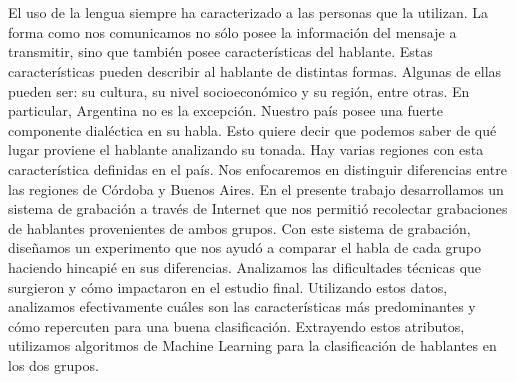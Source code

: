 \chapter*{\runtitulo}

\noindent 

El uso de la lengua siempre ha caracterizado a las personas que la utilizan. La forma como nos comunicamos no sólo posee la información del mensaje a transmitir, sino que también posee características del hablante. Estas características pueden describir al hablante de distintas formas. Algunas de ellas pueden ser: su cultura, su nivel socioeconómico y su región, entre otras. En particular, Argentina no es la excepción. Nuestro país posee una fuerte componente dialéctica en su habla. Esto quiere decir que podemos saber de qué lugar proviene el hablante analizando su tonada. Hay varias regiones con esta característica definidas en el país. Nos enfocaremos en distinguir diferencias entre las regiones de Córdoba y Buenos Aires. En el presente trabajo desarrollamos un sistema de grabación a través de Internet que nos permitió recolectar grabaciones de hablantes provenientes de ambos grupos. Con este sistema de grabación, diseñamos un experimento que nos ayudó a comparar el habla de cada grupo haciendo hincapié en sus diferencias. Analizamos las dificultades técnicas que surgieron y cómo impactaron en el estudio final. Utilizando estos datos, analizamos efectivamente cuáles son las características más predominantes y cómo repercuten para una buena clasificación. Extrayendo estos atributos, utilizamos algoritmos de Machine Learning para la clasificación de hablantes en los dos grupos. 




